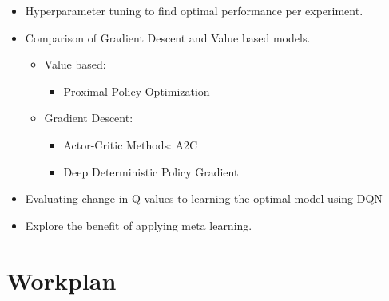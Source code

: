 \documentclass{surrey_disso_style}
\begin{document}
\begin{itemize}
   \item Hyperparameter tuning to find optimal performance per experiment.
   \item Comparison of Gradient Descent and Value based models.
   \begin{itemize}
      \item Value based:
         \begin{itemize}
            \item Proximal Policy Optimization
         \end{itemize}
      \item Gradient Descent:
         \begin{itemize}
            \item Actor-Critic Methods: A2C 
            \item Deep Deterministic Policy Gradient
         \end{itemize}
   \end{itemize}
   \item Evaluating change in Q values to learning the optimal model using DQN
   \item Explore the benefit of applying meta learning.
\end{itemize}

\newpage
\section{Workplan}

\renewcommand{\arraystretch}{1.5}
\setlength{\tabcolsep}{8pt}
\end{document}
